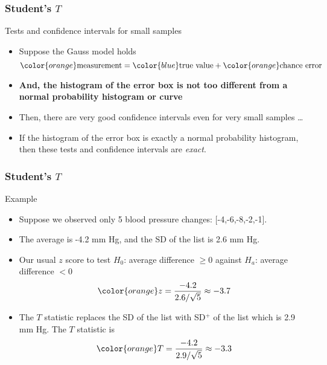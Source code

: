 \documentclass[handout]{beamer}
\begin{document}

   \begin{frame} \frametitle{Student's $T$}

   \begin{block}
   {Tests and confidence intervals for small samples}
   \begin{itemize}

   \item Suppose the Gauss model holds
     $$
     {\color{orange} \text{measurement}} = {\color{blue} \text{true value}} + {\color{orange} \text{chance error}}
     $$
   \item {\bf And, the histogram of the error box is not too different
   from a normal probability histogram or curve}

   \item Then, there are very good confidence intervals
   even for very small samples \dots

   \item If the histogram of the error box is exactly
   a normal probability histogram, then these tests and confidence
   intervals are {\em exact}.
   \end{itemize}
   \end{block}
   \end{frame}


   \begin{frame} \frametitle{Student's $T$}

   \begin{block}
     {Example}
     \begin{itemize}
     \item Suppose we observed only 5 blood pressure changes: [-4,-6,-8,-2,-1].
     \item The average is -4.2 mm Hg, and the SD of the list is 2.6 mm Hg.
     \item Our usual $z$ score to test $H_0$: average difference $\geq 0$
     against $H_a$: average difference $<0$
     $$
     {\color{orange} z = \frac{-4.2}{2.6 / \sqrt{5}} \approx -3.7}
     $$
     \item The $T$ statistic replaces the SD of the list with SD$^+$ of the list
     which is 2.9 mm Hg. The $T$ statistic is
     $$
     {\color{orange} T = \frac{-4.2}{2.9 / \sqrt{5}} \approx -3.3}
     $$
     \end{itemize}
   \end{block}
   \end{frame}
\end{document}
